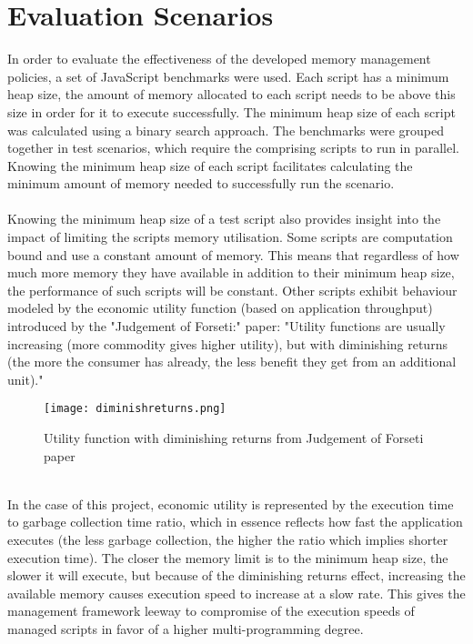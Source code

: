\documentclass{l4proj}
\begin{document}
\section{Evaluation Scenarios}
\hspace*{3em} In order to evaluate the effectiveness of the developed memory management policies, a set of JavaScript benchmarks were used. Each script has a minimum heap size, the amount of memory allocated to each script needs to be above this size in order for it to execute successfully. The minimum heap size of each script was calculated using a binary search approach. The benchmarks were  grouped together in test scenarios, which require the comprising scripts to run in parallel. Knowing the minimum heap size of each script facilitates calculating the minimum amount of memory needed to successfully run the scenario. 
\\\\
\hspace*{3em} Knowing the minimum heap size of a test script also provides insight into the impact of limiting the scripts memory utilisation. Some scripts are computation bound and use a constant amount of memory. This means that regardless of how much more memory they have available in addition to their minimum heap size, the performance of such scripts will be constant. Other scripts exhibit behaviour modeled by the economic utility function (based on application throughput) introduced by the "Judgement of Forseti:" paper: "Utility functions are usually increasing (more commodity gives higher utility), but with diminishing returns (the more the consumer has already, the less benefit they get from an additional unit)."\cite{diminishreturns}
\begin{figure}[!ht]
  \centering
    \texttt{[image: diminishreturns.png]}
    \caption{Utility function with diminishing returns from Judgement of Forseti paper}
\end{figure}
\\
In the case of this project, economic utility is represented by the execution time to garbage collection time ratio, which in essence reflects how fast the application executes (the less garbage collection, the higher the ratio which implies shorter execution time). The closer the memory limit is to the minimum heap size, the slower it will execute, but because of the diminishing returns effect, increasing the available memory causes execution speed to increase at a slow rate. This gives the management framework leeway to compromise of the execution speeds of managed scripts in favor of a higher multi-programming degree.
\end{document}
